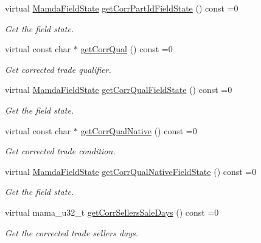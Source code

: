 \begin{CompactItemize}
virtual \hyperlink{namespaceWombat_93aac974f2ab713554fd12a1fa3b7d2a}{Mamda\-Field\-State} \hyperlink{classWombat_1_1MamdaTradeCorrection_8df9e9f374ef26377add4eec1da4bd43}{get\-Corr\-Part\-Id\-Field\-State} () const =0
\begin{CompactList}\small\item\em Get the field state. \item\end{CompactList}\item 
virtual const char $\ast$ \hyperlink{classWombat_1_1MamdaTradeCorrection_f196c22d5419d952815af377bbd9639c}{get\-Corr\-Qual} () const =0
\begin{CompactList}\small\item\em Get corrected trade qualifier. \item\end{CompactList}\item 
virtual \hyperlink{namespaceWombat_93aac974f2ab713554fd12a1fa3b7d2a}{Mamda\-Field\-State} \hyperlink{classWombat_1_1MamdaTradeCorrection_984b2d9f15a3676c9e1aa37972a6f53d}{get\-Corr\-Qual\-Field\-State} () const =0
\begin{CompactList}\small\item\em Get the field state. \item\end{CompactList}\item 
virtual const char $\ast$ \hyperlink{classWombat_1_1MamdaTradeCorrection_9506794767b00b9609a232b2bc3328f0}{get\-Corr\-Qual\-Native} () const =0
\begin{CompactList}\small\item\em Get corrected trade condition. \item\end{CompactList}\item 
virtual \hyperlink{namespaceWombat_93aac974f2ab713554fd12a1fa3b7d2a}{Mamda\-Field\-State} \hyperlink{classWombat_1_1MamdaTradeCorrection_733dac2fd8b2b932abca4dff5bad8fbc}{get\-Corr\-Qual\-Native\-Field\-State} () const =0
\begin{CompactList}\small\item\em Get the field state. \item\end{CompactList}\item 
virtual mama\_\-u32\_\-t \hyperlink{classWombat_1_1MamdaTradeCorrection_95b91482ecf2a00c648446a8504f0fbf}{get\-Corr\-Sellers\-Sale\-Days} () const =0
\begin{CompactList}\small\item\em Get the corrected trade sellers days. \item\end{CompactList}\item 

\end{CompactItemize}
